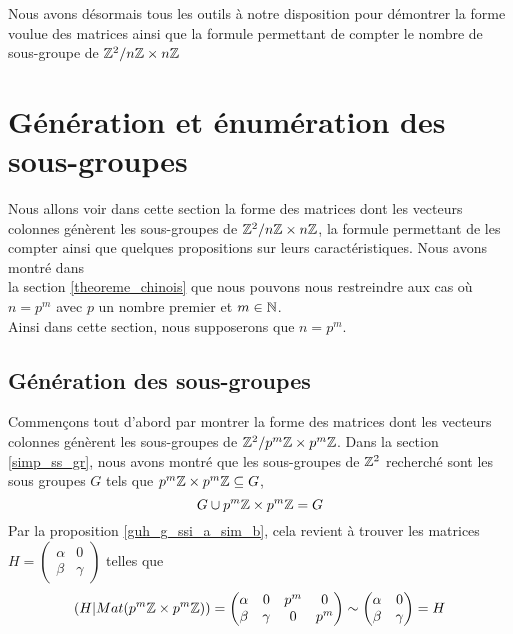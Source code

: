 \documentclass[12pt]{article}
\newcommand*{\pmZpmZ }{p^m\Z \x p^m\Z}
\newcommand*{\ZZpmZ}{\Z^2/\pmZpmZ}
\newcommand*{\ZZnZ}{\Z^2/\nZnZ}
\newcommand{\nZnZ}{n\Z \x n\Z}
\begin{document}
Nous avons désormais tous les outils à notre disposition pour
démontrer la forme voulue des matrices ainsi que la formule permettant de compter le nombre
de sous-groupe de $\ZZnZ$

\newpage
\section {Génération et énumération des sous-groupes}
Nous allons voir dans cette section la forme des matrices dont les vecteurs colonnes génèrent
les sous-groupes de $\ZZnZ$, la formule permettant de les compter ainsi que quelques propositions
sur leurs caractéristiques. Nous avons montré dans\\
la section \ref{theoreme_chinois} que nous
pouvons nous restreindre aux cas où $n = p^m$ avec $p$ un nombre premier et $m \in \mathbb N$.\\
Ainsi dans cette section, nous supposerons que $n = p^m$.

\subsection{Génération des sous-groupes}
Commençons tout d'abord par montrer la forme des matrices dont les vecteurs colonnes génèrent
les sous-groupes de $\ZZpmZ$. Dans la section \ref{simp_ss_gr}, nous avons montré que les
sous-groupes de $\mathbb Z^2$ recherché sont les sous groupes $G$ tels que
$\pmZpmZ \subseteq G$, \cad
$$ G \cup \pmZpmZ = G$$
Par la proposition \ref{guh_g_ssi_a_sim_b}, cela revient à trouver les
matrices $H = \begin{pmatrix}
		\alpha & 0      \\
		\beta  & \gamma
	\end{pmatrix}$
telles que $$(H | Mat(\pmZpmZ)) =
	\begin{pmatrix}
		\alpha & 0      & p^m & 0   \\
		\beta  & \gamma & 0   & p^m
	\end{pmatrix}
	\sim	\begin{pmatrix}
		\alpha & 0      \\
		\beta  & \gamma
	\end{pmatrix}
	= H
$$
\end{document}
